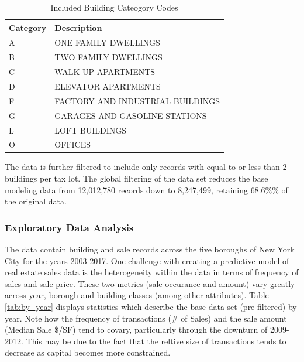 \documentclass[12pt,]{article}
\begin{document}
\begin{table}

\caption{\label{tab:unnamed-chunk-6}\label{tab:categoryTable} Included Building Cateogory Codes}
\centering
\begin{tabular}[t]{ll}
\toprule
Category & Description\\
\midrule
A & ONE FAMILY DWELLINGS\\
B & TWO FAMILY DWELLINGS\\
C & WALK UP APARTMENTS\\
D & ELEVATOR APARTMENTS\\
F & FACTORY AND INDUSTRIAL BUILDINGS\\
\addlinespace
G & GARAGES AND GASOLINE STATIONS\\
L & LOFT BUILDINGS\\
O & OFFICES\\
\bottomrule
\end{tabular}
\end{table}

The data is further filtered to include only records with equal to or
less than 2 buildings per tax lot. The global filtering of the data set
reduces the base modeling data from 12,012,780 records down to
8,247,499, retaining 68.6\%\% of the original data.

\hypertarget{exploratory-data-analysis}{%
\subsubsection{Exploratory Data
Analysis}\label{exploratory-data-analysis}}

The data contain building and sale records across the five boroughs of
New York City for the years 2003-2017. One challenge with creating a
predictive model of real estate sales data is the heterogeneity within
the data in terms of frequency of sales and sale price. These two
metrics (sale occurance and amount) vary greatly across year, borough
and building classes (among other attributes). Table \ref{tab:by_year}
displays statistics which describe the base data set (pre-filtered) by
year. Note how the frequency of transactions (\# of Sales) and the sale
amount (Median Sale \$/SF) tend to covary, particularly through the
downturn of 2009-2012. This may be due to the fact that the reltive size
of transactions tends to decrease as capital becomes more constrained.
\end{document}
